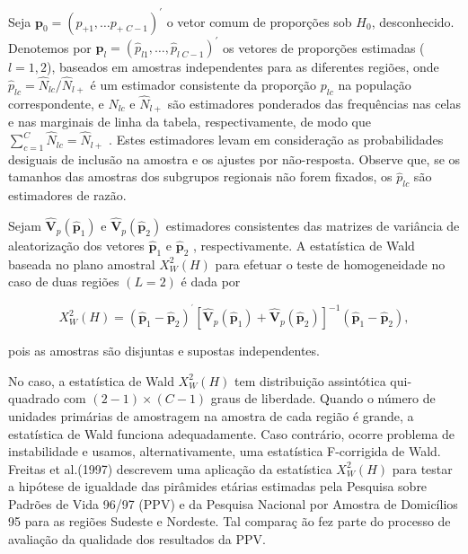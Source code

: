 \documentclass[]{book}
\numberwithin{example}{chapter}
\numberwithin{remark}{chapter}
\numberwithin{definition}{chapter}
\begin{document}
Seja
\(\mathbf{p}_{0}=\left( p_{+1},\ldots p_{+\;C-1}\right) ^{\prime }\) o
vetor comum de proporções sob \(H_{0}\), desconhecido. Denotemos por
\(\mathbf{\hat{p}}_{l}=\left( \hat{p}_{l1},\ldots ,\hat{p} _{l\;C-1}\right) ^{\prime }\)
os vetores de proporções estimadas (\(l=1,2\)), baseados em amostras
independentes para as diferentes regiões, onde
\(\hat{p}_{lc}=\widehat{N}_{lc}/\widehat{N}_{l+}\) é um estimador
consistente da proporção \(p_{lc}\) na população correspondente, e
\(\widehat{N}_{lc}\) e \(\widehat{N}_{l+}\) são estimadores ponderados
das frequências nas celas e nas marginais de linha da tabela,
respectivamente, de modo que
\(\sum\nolimits_{c=1}^{C} \widehat{N}_{lc}=\widehat{N}_{l+}\) . Estes
estimadores levam em consideração as probabilidades desiguais de
inclusão na amostra e os ajustes por não-resposta. Observe que, se os
tamanhos das amostras dos subgrupos regionais não forem fixados, os
\(\hat{p}_{lc}\) são estimadores de razão.

Sejam \(\mathbf{\hat{V}}_{p}\left( \widehat{\mathbf{p}}_{1}\right)\) e
\(\mathbf{\hat{V}}_{p}\left( \widehat{\mathbf{p}}_{2}\right)\)
estimadores consistentes das matrizes de variância de aleatorização dos
vetores \(\widehat{\mathbf{p}}_{1}\) e \(\widehat{\mathbf{p}}_{2}\) ,
respectivamente. A estatística de Wald baseada no plano amostral
\(X_{W}^{2}\left( H\right)\) para efetuar o teste de homogeneidade no
caso de duas regiões \(\left( L=2\right)\) é dada por

\begin{equation}
X_{W}^{2}\left( H\right) =\left( \mathbf{\hat{p}}_{1}-\mathbf{\hat{p}}
_{2}\right) ^{^{\prime }}\left[ \mathbf{\hat{V}}_{p}\left( \widehat{\mathbf{p
}}_{1}\right) +\mathbf{\hat{V}}_{p}\left( \widehat{\mathbf{p}}_{2}\right)
\right] ^{-1}\left( \mathbf{\hat{p}}_{1}-\mathbf{\hat{p}}_{2}\right) ,
\label{eq:Tab1}
\end{equation}

pois as amostras são disjuntas e supostas independentes.

No caso, a estatística de Wald \(X_{W}^{2}\left( H\right)\) tem
distribuição assintótica qui-quadrado com
\(\left( 2-1\right) \times \left( C-1\right)\) graus de liberdade.
Quando o número de unidades primárias de amostragem na amostra de cada
região é grande, a estatística de Wald funciona adequadamente. Caso
contrário, ocorre problema de instabilidade e usamos, alternativamente,
uma estatística F-corrigida de Wald. Freitas et al.(1997) descrevem uma
aplicação da estatística \(X_{W}^{2}\left( H\right)\) para testar a
hipótese de igualdade das pirâmides etárias estimadas pela Pesquisa
sobre Padrões de Vida 96/97 (PPV) e da Pesquisa Nacional por Amostra de
Domicílios 95 para as regiões Sudeste e Nordeste. Tal compara\c{c
}ão fez parte do processo de avaliação da qualidade dos resultados da
PPV.
\end{document}
